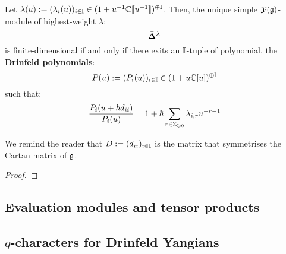         \begin{theorem} \label{theorem: classification_of_finite_dimensional_simple_modules_of_finite_untwisted_yangians}
            Let $\lambda(u) := ( \lambda_i(u) )_{i \in \mathbb{I}} \in (1 + u^{-1}\mathbb{C}[\![u^{-1}]\!])^{\oplus \mathbb{I}}$. Then, the unique simple $\mathcal{Y}(\mathfrak{g})$-module of highest-weight $\lambda$:
                $$\bar{ \mathbf{ \Delta } }^{\lambda}$$
            is finite-dimensional if and only if there exits an $\mathbb{I}$-tuple of polynomial, the \textbf{Drinfeld polynomials}:
                $$P(u) := ( P_i(u) )_{i \in \mathbb{I}} \in (1 + u\mathbb{C}[u])^{\oplus \mathbb{I}}$$
            such that:
                $$\frac{P_i(u + \hbar d_{ii})}{P_i(u)} = 1 + \hbar \sum_{r \in \mathbb{Z}_{\geqslant 0}} \lambda_{i, r} u^{-r - 1}$$
        \end{theorem}
        We remind the reader that $D := (d_{ii})_{i \in \mathbb{I}}$ is the matrix that symmetrises the Cartan matrix of $\mathfrak{g}$.
            \begin{proof}
                
            \end{proof}
        \begin{definition} \label{def: dominant_integral_weights_yangians}
            
        \end{definition}

    \subsection{Evaluation modules and tensor products}

    \subsection{\texorpdfstring{$q$}{}-characters for Drinfeld Yangians}
